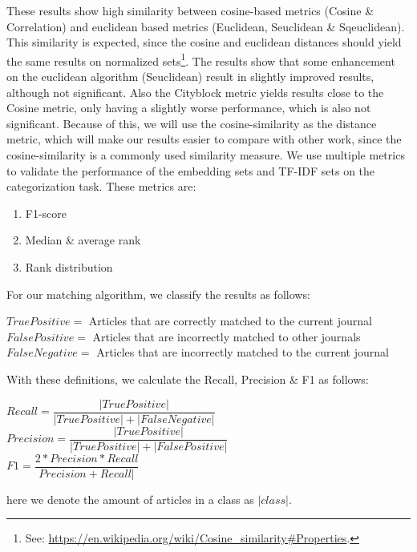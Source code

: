 \documentclass[../../Thesis.tex]{subfiles}
\begin{document}
These results show high similarity between cosine-based metrics (Cosine \& Correlation) and euclidean based metrics (Euclidean, Seuclidean \& Sqeuclidean). This similarity is expected, since the cosine and euclidean distances should yield the same results on normalized sets\footnote{See: \url{https://en.wikipedia.org/wiki/Cosine_similarity\#Properties}.}. The results show that some enhancement on the euclidean algorithm (Seuclidean) result in slightly improved results, although not significant. Also the Cityblock metric yields results close to the Cosine metric, only having a slightly worse performance, which is also not significant. Because of this, we will use the cosine-similarity as the distance metric, which will make our results easier to compare with other work, since the cosine-similarity is a commonly used similarity measure.
We use multiple metrics to validate the performance of the embedding sets and TF-IDF sets on the categorization task. These metrics are:
\begin{enumerate}
\item{F1-score}
\item{Median \& average rank}
\item{Rank distribution}
\end{enumerate}
For our matching algorithm, we classify the results as follows:
\begin{jumpin}
$True Positive = $ Articles that are correctly matched to the current journal\\
$False Positive = $ Articles that are incorrectly matched to other journals\\
$False Negative = $ Articles that are incorrectly matched to the current journal\\
\end{jumpin}
With these definitions, we calculate the Recall, Precision \& F1 as follows:\\
\begin{jumpin}
$Recall = \dfrac{|True Positive|}{|True Positive| + |False Negative|}$\vspace{0.1in}\\
$Precision = \dfrac{|True Positive|}{|True Positive| + |False Positive|}$\vspace{0.1in}\\
$F1 = \dfrac{2 * Precision * Recall}{Precision + Recall|}$
\end{jumpin}
here we denote the amount of articles in a class as $|class|$.
\end{document}
